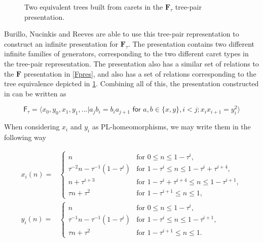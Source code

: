 \documentclass[
11pt, %
english, %
singlespacing, %
parskip, %
headsepline, %
]{amsart} %
\theoremstyle{definition}
\newcommand{\TF}{\textbf{F}}
\newcommand{\FN}[1]{$\textbf{F}_{#1}$}
\begin{document}
\begin{center}
\begin{figure}[H]
\centering
{}
\caption{Two equivalent trees built from carets in the \FN{\tau} tree-pair presentation.} \label{equitree}
\end{figure}
\end{center}

Burillo, Nucinkis and Reeves are able to use this tree-pair representation to construct an infinite presentation for \FN{\tau}. The presentation contains two different infinite families of generators, corresponding to the two different caret types in the tree-pair representation. The presentation also has a similar set of relations to the $\TF$ presentation in \ref{Fpres}, and also has a set of relations corresponding to the tree equivalence depicted in \ref{equitree}. Combining all of this, the presentation constructed in \cite{Ftau} can be written as

\begin{equation}\label{taupres}
\textsf{F}_{\tau} = \langle x_0, y_0, x_1, y_1,... | a_j b_i = b_i a_{j+1} \textsf{ for } a, b \in \{x,y\}, i<j;x_i x_{i+1} = y_i^2 \rangle
\end{equation}
\par
When considering $x_i$ and $y_i$ as PL-homeomorphisms, we may write them in the following way

\begin{equation}\label{generators} 
\begin{aligned}
x_i(n) = & {\left\{
	\begin{array}{llll}
	n & \mbox{for } 0 \leq n \leq 1-\tau^i, \\
	\tau^{-2} n - \tau^{-1}(1-\tau^i)& \mbox{for } 1-\tau^i \leq n \leq 1-\tau^i+\tau^{i+4}, \\
	n + \tau^{i+3} & \mbox{for } 1-\tau^i+\tau^{i+4} \leq n \leq 1-\tau^{i+1}, \\
	\tau n + \tau^2  & \mbox{for } 1-\tau^{i+1} \leq n \leq 1,
	\end{array}
	\right.} \\
y_i(n) = & {\left\{
	\begin{array}{llll}
	n & \mbox{for } 0 \leq n \leq 1-\tau^i, \\
	\tau^{-1} n - \tau^{-1}(1-\tau^i)& \mbox{for } 1-\tau^i \leq n \leq 1-\tau^{i+1}, \\
	\tau n + \tau^2  & \mbox{for } 1-\tau^{i+1} \leq n \leq 1.
	\end{array}
	\right.}
\end{aligned}
\end{equation}
\\
\end{document}
